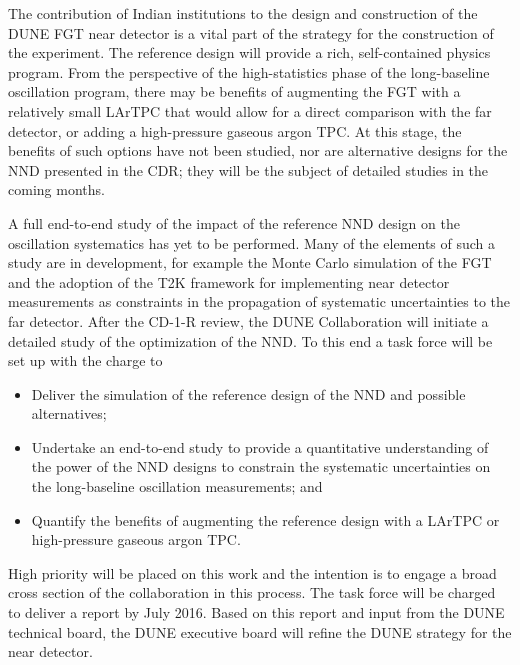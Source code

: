The contribution of Indian institutions to the design and construction
of the DUNE FGT near detector is a vital part of the strategy for the
construction of the experiment. The reference design will provide a
rich, self-contained physics program. From the perspective of the
high-statistics phase of the long-baseline oscillation program, there
may be benefits of augmenting the FGT with a relatively small LArTPC
that would allow for a direct comparison with the far detector, or
adding a high-pressure gaseous argon TPC. At this stage, the benefits
of such options have not been studied, nor are alternative designs for
the NND presented in the CDR; they will be the subject of detailed
studies in the coming months.

A full end-to-end study of the impact of the reference NND 
design on the
oscillation systematics has yet to be performed. Many of the elements
of such a study are in development, for example the Monte Carlo
simulation of the FGT and the adoption of the T2K framework for
implementing near detector measurements as constraints in the propagation of
systematic uncertainties to the far detector.  After the CD-1-R review, the DUNE
Collaboration will initiate a detailed study of the optimization of
the NND. 
To this end a task force will be set up with the
charge to
\begin{itemize}
\item Deliver the simulation of the reference design of the NND and
  possible alternatives;
\item Undertake an end-to-end study to provide a quantitative
  understanding of the power of the NND designs to constrain the
  systematic uncertainties on the long-baseline oscillation measurements; and
\item Quantify the benefits of augmenting the reference design with
  a LArTPC or high-pressure gaseous argon TPC.
\end{itemize}
High priority will be placed on this work and the intention is to
engage a broad cross section of the collaboration in this process. The
task force will be charged to deliver a report by July 2016. Based on
this report and input from the DUNE technical board,
the DUNE executive board will refine the DUNE strategy for the near
detector. 
